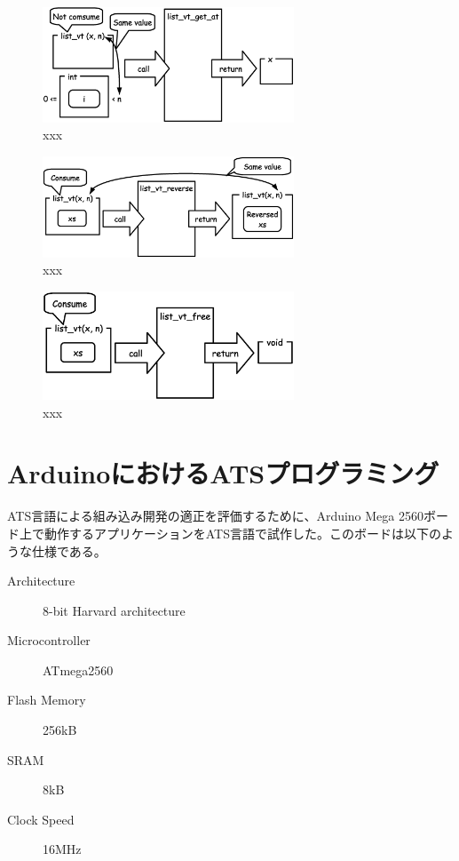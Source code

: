 \documentclass{ipsjprosym}
\begin{document}
\begin{figure}[h]
\centering
\includegraphics[width=75mm]{draw/list_vt_get_at.eps}
\caption{xxx}
\label{fig:xxx}
\end{figure}

\begin{figure}[h]
\centering
\includegraphics[width=75mm]{draw/list_vt_reverse.eps}
\caption{xxx}
\label{fig:xxx}
\end{figure}

\begin{figure}[h]
\centering
\includegraphics[width=75mm]{draw/list_vt_free.eps}
\caption{xxx}
\label{fig:xxx}
\end{figure}

\section{ArduinoにおけるATSプログラミング}

ATS言語による組み込み開発の適正を評価するために、Arduino Mega 2560ボード上で動作するアプリケーションをATS言語で試作した。このボードは以下のような仕様である。

\begin{description}
  \item[Architecture] 8-bit Harvard architecture
  \item[Microcontroller] ATmega2560
  \item[Flash Memory] 256kB
  \item[SRAM] 8kB
  \item[Clock Speed] 16MHz
\end{description}
\end{document}
